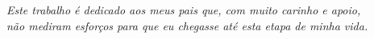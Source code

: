 \begin{dedicatoria}
   \vspace*{\fill}
   \centering
   \noindent
    \textit{Este trabalho é dedicado aos meus pais que, com muito carinho e apoio,\\
    não mediram esforços para que eu chegasse até esta etapa de minha vida.} 
   \vspace*{\fill}
\end{dedicatoria}